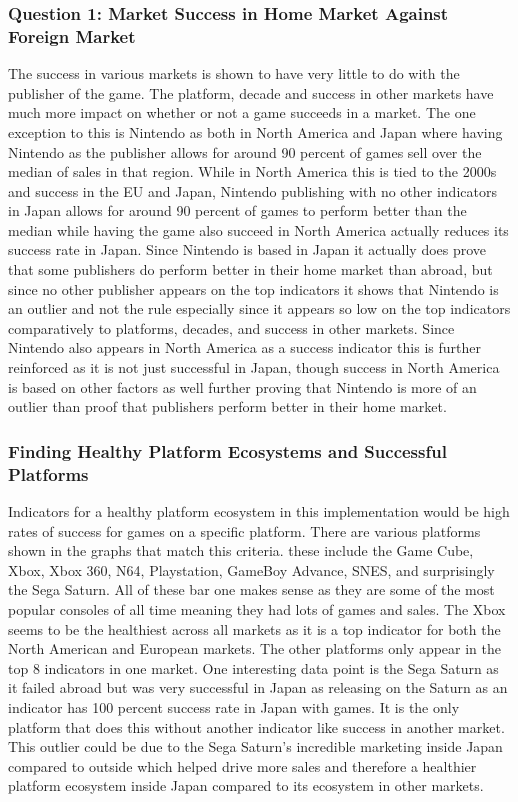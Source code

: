 \documentclass[conference]{IEEEtran}
\begin{document}
\subsubsection{Question 1: Market Success in Home Market Against
Foreign Market}
The success in various markets is shown to have very little to do with the publisher of the game. The platform, decade and success in other markets have much more impact on whether or not a game succeeds in a market. The one exception to this is Nintendo as both in North America and Japan where having Nintendo as the publisher allows for around 90 percent of games sell over the median of sales in that region. While in North America this is tied to the 2000s and success in the EU and Japan, Nintendo publishing with no other indicators in Japan allows for around 90 percent of games to perform better than the median while having the game also succeed in North America actually reduces its success rate in Japan. Since Nintendo is based in Japan it actually does prove that some publishers do perform better in their home market than abroad, but since no other publisher appears on the top indicators it shows that Nintendo is an outlier and not the rule especially since it appears so low on the top indicators comparatively to platforms, decades, and success in other markets. Since Nintendo also appears in North America as a success indicator this is further reinforced as it is not just successful in Japan, though success in North America is based on other factors as well further proving that Nintendo is more of an outlier than proof that publishers perform better in their home market.

\subsubsection{Finding Healthy Platform Ecosystems and Successful Platforms}
Indicators for a healthy platform ecosystem in this implementation would be high rates of success for games on a specific platform. There are various platforms shown in the graphs that match this criteria. these include the Game Cube, Xbox, Xbox 360, N64, Playstation, GameBoy Advance, SNES, and surprisingly the Sega Saturn. All of these bar one makes sense as they are some of the most popular consoles of all time meaning they had lots of games and sales. The Xbox seems to be the healthiest across all markets as it is a top indicator for both the North American and European markets. The other platforms only appear in the top 8 indicators in one market. One interesting data point is the Sega Saturn as it failed abroad but was very successful in Japan as releasing on the Saturn as an indicator has 100 percent success rate in Japan with games. It is the only platform that does this without another indicator like success in another market. This outlier could be due to the Sega Saturn's incredible marketing inside Japan compared to outside which helped drive more sales and therefore a healthier platform ecosystem inside Japan compared to its ecosystem in other markets.
\end{document}
